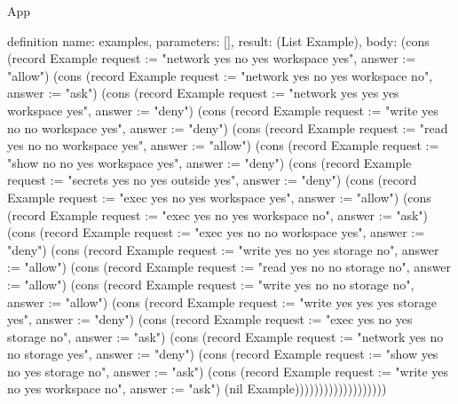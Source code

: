 \begin{lexlean}{App}
\begin{semanticmodule}
definition{
  name: examples,
  parameters: [],
  result: (List Example),
  body: (cons (record Example {request := "network yes no yes workspace yes", answer := "allow"}) (cons (record Example {request := "network yes no yes workspace no", answer := "ask"}) (cons (record Example {request := "network yes yes yes workspace yes", answer := "deny"}) (cons (record Example {request := "write yes no no workspace yes", answer := "deny"}) (cons (record Example {request := "read yes no no workspace yes", answer := "allow"}) (cons (record Example {request := "show no no yes workspace yes", answer := "deny"}) (cons (record Example {request := "secrets yes no yes outside yes", answer := "deny"}) (cons (record Example {request := "exec yes no yes workspace yes", answer := "allow"}) (cons (record Example {request := "exec yes no yes workspace no", answer := "ask"}) (cons (record Example {request := "exec yes no no workspace yes", answer := "deny"}) (cons (record Example {request := "write yes no yes storage no", answer := "allow"}) (cons (record Example {request := "read yes no no storage no", answer := "allow"}) (cons (record Example {request := "write yes no no storage no", answer := "allow"}) (cons (record Example {request := "write yes yes yes storage yes", answer := "deny"}) (cons (record Example {request := "exec yes no yes storage no", answer := "ask"}) (cons (record Example {request := "network yes no no storage yes", answer := "deny"}) (cons (record Example {request := "show yes no yes storage no", answer := "ask"}) (cons (record Example {request := "write yes no yes workspace no", answer := "ask"}) (nil Example)))))))))))))))))))
}
\end{semanticmodule}
\end{lexlean}
